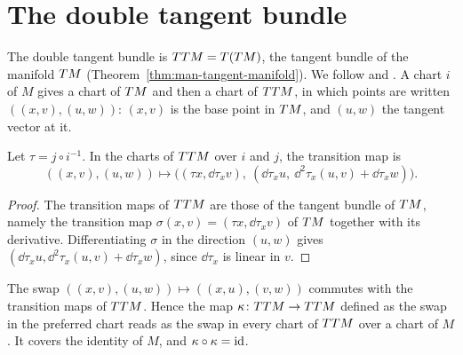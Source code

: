 \section{The double tangent bundle}

The double tangent bundle is $TT M = T(T M)$, the tangent bundle of the manifold $T M$
(Theorem~\ref{thm:man-tangent-manifold}). We follow \cite[Cap.~5]{Lar22} and \cite[\S
IV.3]{Lan99}. A chart $i$ of $M$ gives a chart of $T M$ and then a chart of $TT M$, in which
points are written $((x, v), (u, w))$: $(x, v)$ is the base point in $T M$, and $(u, w)$ the
tangent vector at it.

\begin{theorem}
  \label{thm:man-double-transition}
  \leanok
  Let $\tau = j \circ i^{-1}$. In the charts of $TT M$ over $i$ and $j$, the transition map is
  \[
    ((x, v), (u, w)) \longmapsto \bigl((\tau x, \dd\tau_x v),\ (\dd\tau_x u,\ \dd^2\tau_x(u, v)
    + \dd\tau_x w)\bigr).
  \]
\end{theorem}

\begin{proof}
  \leanok
  The transition maps of $TT M$ are those of the tangent bundle of $T M$, namely the
  transition map $\sigma(x, v) = (\tau x, \dd\tau_x v)$ of $T M$ together with its derivative.
  Differentiating $\sigma$ in the direction $(u, w)$ gives $(\dd\tau_x u, \dd^2\tau_x(u, v) +
  \dd\tau_x w)$, since $\dd\tau_x$ is linear in $v$.
\end{proof}

\begin{theorem}
  \label{thm:man-flip}
  \leanok
  The swap $((x, v), (u, w)) \mapsto ((x, u), (v, w))$ commutes with the transition maps of
  $TT M$. Hence the map $\kappa \colon TT M \to TT M$ defined as the swap in the preferred
  chart reads as the swap in every chart of $TT M$ over a chart of $M$. It covers the identity
  of $M$, and $\kappa \circ \kappa = \mathrm{id}$.
\end{theorem}

